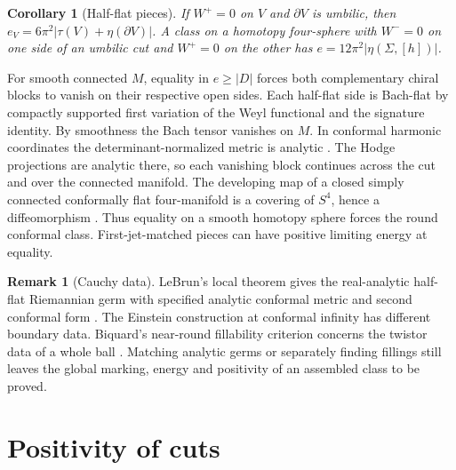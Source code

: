 \documentclass[11pt,letterpaper]{article}
\numberwithin{equation}{section}
\newtheorem{corollary}[theorem]{Corollary}
\theoremstyle{definition}
\newtheorem{remark}[theorem]{Remark}
\begin{document}
\begin{corollary}[Half-flat pieces]\label{cor:halfflat}
If \(W^+=0\) on \(V\) and \(\partial V\) is umbilic, then
\(e_V=6\pi^2|\tau(V)+\eta(\partial V)|\). A class on a homotopy four-sphere
with \(W^-=0\) on one side of an umbilic cut and \(W^+=0\) on the other
has \(e=12\pi^2|\eta(\Sigma,[h])|\).
\end{corollary}

For smooth connected \(M\), equality in \(e\ge |D|\) forces
both complementary chiral blocks to vanish on their respective open
sides. Each half-flat side is Bach-flat by compactly supported first
variation of the Weyl functional and the signature identity. By
smoothness the Bach tensor vanishes on \(M\). In conformal harmonic
coordinates the determinant-normalized metric is analytic
\cite[Theorem 3.7(c)]{LassasLiimatainen2019ConformalHarmonic}.
The Hodge projections are analytic there, so each vanishing block
continues across the cut and over the connected manifold. The developing
map of a closed simply connected conformally flat four-manifold is a
covering of \(S^4\), hence a diffeomorphism
\cite{SchoenYau1988Conformal}. Thus equality on a smooth homotopy
sphere forces the round conformal class. First-jet-matched pieces can
have positive limiting energy at equality.

\begin{remark}[Cauchy data]\label{rem:cauchy}
LeBrun's local theorem gives the real-analytic half-flat Riemannian
germ with specified analytic conformal metric and second conformal
form \cite[Theorem 3.6.1]{LeBrun1980ComplexGeodesics}.
The Einstein construction at conformal infinity
\cite{LeBrun1982HSpace} has different boundary data.
Biquard's near-round fillability criterion concerns the twistor data
of a whole ball \cite{Biquard2002Autoduales}. Matching analytic germs
or separately finding fillings still leaves the global marking, energy
and positivity of an assembled class to be proved.
\end{remark}

\section{Positivity of cuts}\label{sec:positivity}
\end{document}
